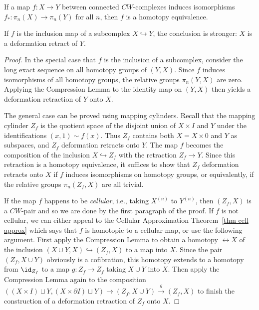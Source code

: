 \begin{thm}\label{thm whitehead}
    If a map $f:X\to Y$ between connected $CW$-complexes induces isomorphisms $f_\ast :\pi_n(X)\to \pi_n(Y)$ for all $n$, then $f$ is a homotopy equivalence. 
    
    If $f$ is the inclusion map of a subcomplex $X\hookrightarrow Y$, the conclusion is stronger: $X$ is a deformation retract of $Y$.
\end{thm}
\begin{proof}
    In the special case that $f$ is the inclusion of a subcomplex, consider the long exact sequence on all homotopy groups of $(Y,X)$. Since $f$ induces isomorphisms of all homotopy groups, the relative groups $\pi_n(Y,X)$ are zero. Applying the Compression Lemma to the identity map on $(Y,X)$ then yields a deformation retraction of $Y$ onto $X$.

    The general case can be proved using mapping cylinders. Recall that the mapping cylinder $Z_f$ is the quotient space of the disjoint union of $X\times I$ and $Y$ under the identifications $( x, 1 ) \sim f ( x )$. Thus $Z_f$ contains both $X = X\times { 0 }$ and $Y$ as subspaces, and $Z_f$ deformation retracts onto $Y$. The map $f$ becomes the composition of the inclusion $X\hookrightarrow Z_f$ with the retraction $Z_f\to Y$. Since this retraction is a homotopy equivalence, it suffices to show that $Z_f$ deformation retracts onto $X$ if $f$ induces isomorphisms on homotopy groups, or equivalently, if the relative groups $\pi_n(Z_f,X)$ are all trivial.

    If the map $f$ happens to be \emph{cellular}, i.e., taking $X^{(n)}$ to $Y^{(n)}$, then $(Z_f,X)$ is a $CW$-pair and so we are done by the first paragraph of the proof. If $f$ is not cellular, we can either appeal to the Cellular Approximation Theorem~\ref{thm cell approx} which says that $f$ is homotopic to a cellular map, or use the following argument. First apply the Compression Lemma to obtain a homotopy $\rel X$ of the inclusion $(X\cup Y,X)\hookrightarrow (Z_f,X)$ to a map into $X$. Since the pair $(Z_f,X\cup Y)$ obviously is a cofibration, this homotopy extends to a homotopy from $\id_{Z_f}$ to a map $g:Z_f\to Z_f$ taking $X\cup Y$ into $X$. Then apply the Compression Lemma again to the composition $((X\times I)\sqcup Y,(X\times\partial I)\sqcup Y)\to (Z_f,X\cup Y)\overset{g}{\to} (Z_f,X)$ to finish the construction of a deformation retraction of $Z_f$ onto $X$.
\end{proof}

